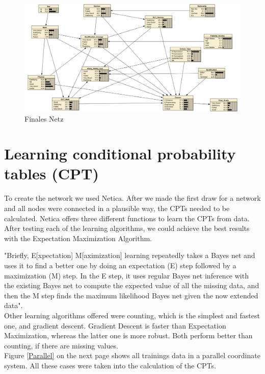 \documentclass[%
	pdftex,
	oneside,        %
	11pt,           %
	parskip=half,   %
	headsepline,    %
	footsepline,    %
	abstracton,     %
	USenglish,      %
	a4paper,        %
]{report}
\begin{document}
\begin{landscape}
	\begin{figure}
		\includegraphics[width=\linewidth]{StudyNet_final_ohne_State.jpeg}
		\centering
		\caption{Finales Netz}
		\label{FinalesNetz}
	\end{figure}
\end{landscape}
  

\chapter{Learning conditional probability tables (CPT)}
To create the network we used Netica. After we made the first draw for a network and all nodes were connected in a plausible way, the CPTs needed to be calculated. Netica offers three different functions to learn the CPTs from data. After testing each of the learning algorithms, we could achieve the best results with the Expectation Maximization Algorithm.

"Briefly, E[xpectation] M[aximization] learning repeatedly takes a Bayes net and uses it to find a better one by doing an expectation (E) step followed by a maximization (M) step. In the E step, it uses regular Bayes net inference with the existing Bayes net to compute the expected value of all the missing data, and then the M step finds the maximum likelihood Bayes net given the now extended data". \cite{Netica:Online}\\
Other learning algorithms offered were counting, which is the simplest and fastest one, and gradient descent. Gradient Descent is faster than Expectation Maximization, whereas the latter one is more robust. Both perform better than counting, if there are missing values.\\
Figure \ref{Parallel}  on the next page shows all trainings data in a parallel coordinate system. All these cases were taken into the calculation of the CPTs.
\end{document}
